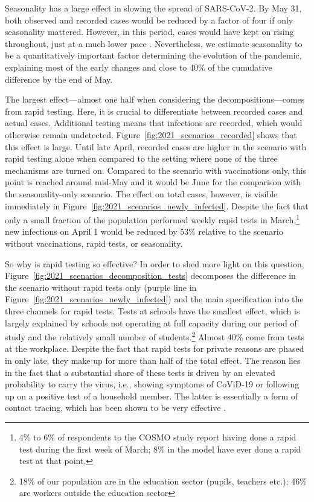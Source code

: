 Seasonality has a large effect in slowing the spread of SARS-CoV-2. By May 31, both
observed and recorded cases would be reduced by a factor of four if only seasonality
mattered. However, in this period, cases would have kept on rising throughout, just at a
much lower pace \citep[this is in line with results in][]{Gavenciak2021}. Nevertheless,
we estimate seasonality to be a quantitatively important factor determining the
evolution of the pandemic, explaining most of the early changes and close to 40\% of the
cumulative difference by the end of May.

The largest effect---almost one half when considering the decompositions---comes from
rapid testing. Here, it is crucial to differentiate between recorded cases and actual
cases. Additional testing means that infections are recorded, which would otherwise
remain undetected. Figure~\ref{fig:2021_scenarios_recorded} shows that this effect is
large. Until late April, recorded cases are higher in the scenario with rapid testing
alone when compared to the setting where none of the three mechanisms are turned on.
Compared to the scenario with vaccinations only, this point is reached around mid-May
and it would be June for the comparison with the seasonality-only scenario. The effect
on total cases, however, is visible immediately in
Figure~\ref{fig:2021_scenarios_newly_infected}. Despite the fact that only a small
fraction of the population performed weekly rapid tests in March,\footnote{4\% to 6\% of
respondents to the COSMO study report having done a rapid test during the first week of
March; 8\% in the model have ever done a rapid test at that point.} new infections on April 1 would be reduced by
53\% relative to the scenario without vaccinations, rapid tests, or seasonality.

So why is rapid testing so effective? In order to shed more light on this question,
Figure~\ref{fig:2021_scenarios_decomposition_tests} decomposes the difference in the
scenario without rapid tests only (purple line in
Figure~\ref{fig:2021_scenarios_newly_infected}) and the main specification into the
three channels for rapid tests. Tests at schools have the smallest effect, which is
largely explained by schools not operating at full capacity during our period of study
and the relatively small number of students.\footnote{18\% of our population are in the
education sector (pupils, teachers etc.); 46\% are workers outside the education sector}
Almost 40\% come from tests at the workplace. Despite the fact that rapid tests for
private reasons are phased in only late, they make up for more than half of the total
effect. The reason lies in the fact that a substantial share of these tests is driven by
an elevated probability to carry the virus, i.e., showing symptoms of CoViD-19 or
following up on a positive test of a household member. The latter is essentially a form
of contact tracing, which has been shown to be very effective \citep{Contreras2021,
Kretzschmar2020,FetzerGraeber2021}.

